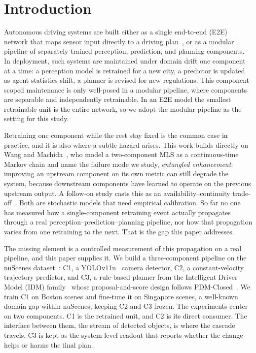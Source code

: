 \documentclass[conference]{IEEEtran}
\begin{document}
\section{Introduction}
Autonomous driving systems are built either as a single end-to-end (E2E)
network that maps sensor input directly to a driving plan~\cite{chen2024e2esurvey,
hu2023uniad}, or as a modular pipeline of separately trained perception,
prediction, and planning components. In deployment, such systems are maintained
under domain drift one component at a time: a perception model is retrained for a
new city, a predictor is updated as agent statistics shift, a planner is revised
for new regulations. This component-scoped maintenance is only well-posed in a
modular pipeline, where components are separable and independently retrainable.
In an E2E model the smallest retrainable unit is the entire network, so we adopt
the modular pipeline as the setting for this study.

Retraining one component while the rest stay fixed is the common case in
practice, and it is also where a subtle hazard arises. This work
builds directly on Wang and Machida~\cite{wang2024compsac}, who model a
two-component MLS as a continuous-time Markov chain and name the failure mode
we study, \emph{entangled enhancement}: improving an upstream component on its
own metric can still degrade the system, because downstream components have
learned to operate on the previous upstream output. A follow-on study casts
this as an availability--continuity trade-off~\cite{wang2025issre}. Both are
stochastic models that need empirical calibration. So far no one has measured
how a single-component retraining event actually propagates through a real
perception--prediction--planning pipeline, nor how that propagation varies from
one retraining to the next. That is the gap this paper addresses.

The missing element is a controlled measurement of this propagation on a real
pipeline, and this paper supplies it. We build a three-component pipeline on
the nuScenes dataset~\cite{caesar2020nuscenes}: C1, a
YOLOv11n~\cite{jocher2024yolo11} camera detector, C2, a constant-velocity
trajectory predictor, and C3, a rule-based planner from the Intelligent Driver
Model (IDM) family~\cite{treiber2000idm} whose proposal-and-score design
follows PDM-Closed~\cite{dauner2023parting}. We train C1 on Boston scenes and
fine-tune it on Singapore scenes, a well-known domain gap within nuScenes,
keeping C2 and C3 frozen. The experiments center on two components. C1 is the
retrained unit, and C2 is its direct consumer. The interface between them, the
stream of detected objects, is where the cascade travels. C3 is kept as the
system-level readout that reports whether the change helps or harms the final
plan.
\end{document}
